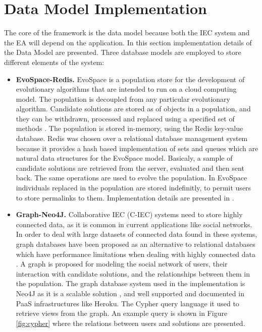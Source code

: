 \section{Data Model Implementation}
\label{sec:implementation}

The core of the framework is the data model because both the IEC system and the EA will 
depend on the application. In this section implementation details of the Data Model are presented.
Three database models are employed to store different elements of the system: 

\begin{itemize}
\item {\bf EvoSpace-Redis.} 
EvoSpace is a population store \cite{Evospace}  for the development of 
evolutionary algorithms that are intended to run on a cloud computing model. 
The population is decoupled from any particular evolutionary algorithm. 
Candidate solutions are stored as of objects in a population, and they can be withdrawn, 
processed and replaced using a specified set of methods \cite{GValdez2015}. The population
is stored in-memory, using the Redis key-value database. Redis was chosen over a relational 
database management system because it provides a hash based implementation of sets and 
queues which are natural data structures for the EvoSpace model. Basicaly, a sample of 
candidate solutions are retrieved from the server, evaluated and then sent back. 
The same operations are used to evolve the population. In EvoSpace individuals replaced 
in the population are stored indefinitly, to permit users to store permalinks to them.
Implementation details are presented in \cite{garcia2013evospace}.

\item {\bf Graph-Neo4J.} 
 Collaborative IEC (C-IEC) systems need to store highly connected data, as it is common 
 in current applications like social networks. In order to deal with large datasets of connected 
 data found in these systems, graph databases \cite{angles2012comparison} have been proposed 
 as an alternative to relational databases which have performance limitations when dealing with 
 highly connected data \cite{holzschuher2013performance}.
 A graph is proposed for modeling the social network of users, their interaction with 
 candidate solutions, and the relationships between them in the population.
 The graph database system used in the implementation is Neo4J as it is
 a scalable solution \cite{miller2013graph,holzschuher2013performance}, and well 
 supported and documented in PaaS infrastructures like Heroku. The Cypher query 
 language it used to retrieve views from the graph.
 An example query is shown in Figure \ref{fig:cypher} where the relations 
 between users and solutions are presented.
  

\end{itemize}
